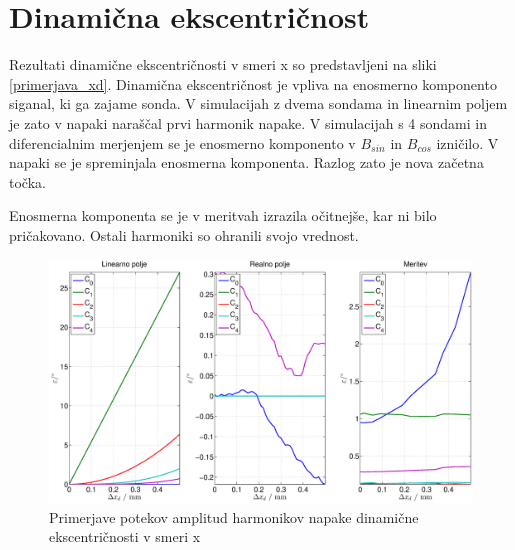 \section{Dinamična ekscentričnost}
Rezultati dinamične ekscentričnosti v smeri x so predstavljeni na sliki \ref{primerjava_xd}. Dinamična ekscentričnost je vpliva na enosmerno komponento siganal, ki ga zajame sonda. V simulacijah z dvema sondama in linearnim poljem je zato v napaki naraščal prvi harmonik napake. V simulacijah s 4 sondami in diferencialnim merjenjem  se je enosmerno komponento v $B_{sin}$ in $B_{cos}$ izničilo. V napaki se je spreminjala  enosmerna komponenta. Razlog zato je nova začetna točka.

Enosmerna komponenta se je v meritvah izrazila očitnejše, kar ni bilo pričakovano. Ostali harmoniki so ohranili svojo vrednost.
\begin{figure}[ht]
	\centering
	\includegraphics[width=\columnwidth]{./Slike/primerjava_xd.eps}
	\caption{Primerjave potekov amplitud harmonikov napake  dinamične ekscentričnosti v smeri x}
	\label{primerjava_xs}
\end{figure}
